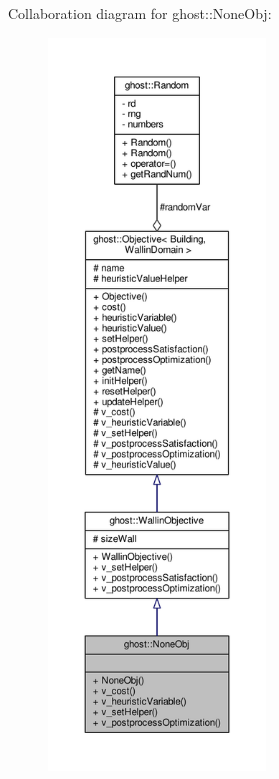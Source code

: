 Collaboration diagram for ghost\-:\-:None\-Obj\-:\nopagebreak
\begin{figure}[H]
\begin{center}
\leavevmode
\includegraphics[height=550pt]{classghost_1_1NoneObj__coll__graph}
\end{center}
\end{figure}
